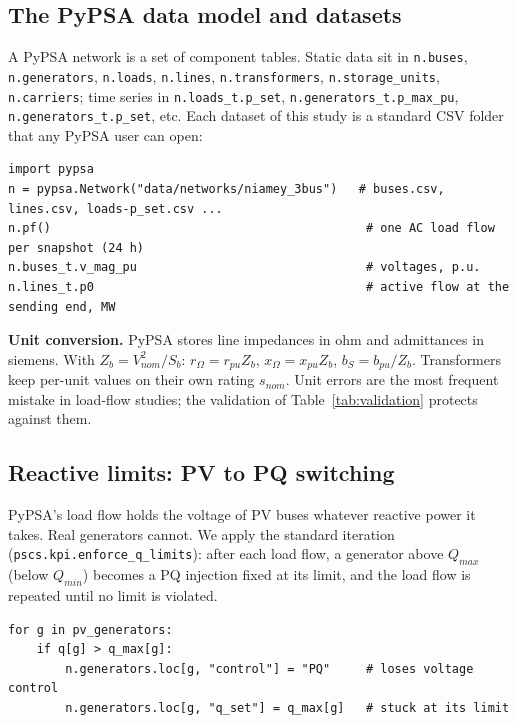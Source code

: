 \documentclass[11pt,a4paper]{article}
\begin{document}
\subsection{The PyPSA data model and datasets}
\begin{sloppypar}A PyPSA network is a set of component tables. Static data sit in \texttt{n.buses},
\texttt{n.generators}, \texttt{n.loads}, \texttt{n.lines}, \texttt{n.transformers},
\texttt{n.storage\_units}, \texttt{n.carriers}; time series in \texttt{n.loads\_t.p\_set},
\texttt{n.generators\_t.p\_max\_pu}, \texttt{n.generators\_t.p\_set}, etc. Each dataset of
this study is a standard CSV folder that any PyPSA user can open:\end{sloppypar}

\begin{lstlisting}
import pypsa
n = pypsa.Network("data/networks/niamey_3bus")   # buses.csv, lines.csv, loads-p_set.csv ...
n.pf()                                            # one AC load flow per snapshot (24 h)
n.buses_t.v_mag_pu                                # voltages, p.u.
n.lines_t.p0                                      # active flow at the sending end, MW
\end{lstlisting}

\textbf{Unit conversion.} PyPSA stores line impedances in ohm and admittances in siemens.
With $Z_b = V_{nom}^2/S_b$: $r_\Omega = r_{pu} Z_b$, $x_\Omega = x_{pu} Z_b$,
$b_S = b_{pu}/Z_b$. Transformers keep per-unit values on their own rating $s_{nom}$. Unit
errors are the most frequent mistake in load-flow studies; the validation of
Table~\ref{tab:validation} protects against them.

\subsection{Reactive limits: PV to PQ switching}
PyPSA's load flow holds the voltage of PV buses whatever reactive power it takes. Real
generators cannot. We apply the standard iteration (\texttt{pscs.kpi.enforce\_q\_limits}):
after each load flow, a generator above $Q_{max}$ (below $Q_{min}$) becomes a PQ injection
fixed at its limit, and the load flow is repeated until no limit is violated.

\begin{lstlisting}
for g in pv_generators:
    if q[g] > q_max[g]:
        n.generators.loc[g, "control"] = "PQ"     # loses voltage control
        n.generators.loc[g, "q_set"] = q_max[g]   # stuck at its limit
\end{lstlisting}
\end{document}
